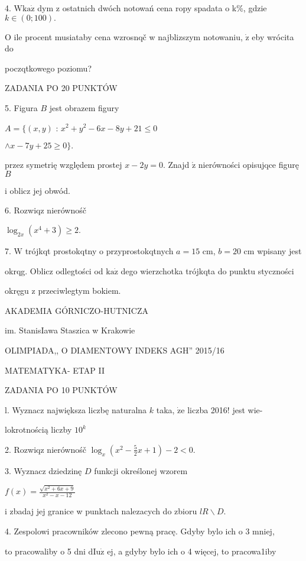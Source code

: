 \documentclass[a4paper,12pt]{article}
\begin{document}
4. $\mathrm{W}\mathrm{k}\mathrm{a}\dot{\mathrm{z}}$ dym z ostatnich dwóch notowań cena ropy spadata o k\%, gdzie $k\in(0;100).$

$\mathrm{O}$ ile procent musiataby cena wzrosnqč w najblizszym notowaniu, $\dot{\mathrm{z}}$ eby wrócita do

poczqtkowego poziomu?

ZADANIA PO 20 PUNKTÓW

5. Figura $B$ jest obrazem figury

$A=\{(x,y)$ : $x^{2}+y^{2}-6x-8y+21\leq 0$

$\wedge x-7y+25\geq 0\}.$

przez symetrię względem prostej $x-2y=0.$ Znajd $\acute{\mathrm{z}}$ nierówności opisujqce figurę $B$

i oblicz jej obwód.

6. Rozwiqz nierównośč

$\log_{2x}(x^{4}+3)\geq 2.$

7. $\mathrm{W}$ trójkqt prostokqtny o przyprostokqtnych $a = 15$ cm, $b = 20$ cm wpisany jest

okrqg. Oblicz odlegtości od $\mathrm{k}\mathrm{a}\dot{\mathrm{z}}$ dego wierzchotka trójkqta do punktu styczności

okręgu z przeciwlegtym bokiem.






AKADEMIA GÓRNICZO-HUTNICZA

im. StanisIawa Staszica w Krakowie

OLIMPIADA,, O DIAMENTOWY INDEKS AGH'' 2015/16

MATEMATYKA- ETAP II

ZADANIA PO 10 PUNKTÓW

l. Wyznacz największa liczbę naturalna $k$ taka, $\dot{\mathrm{z}}\mathrm{e}$ liczba 2016! jest wie-

lokrotnością liczby $10^{k}$

2. Rozwiqz nierównośč $\displaystyle \log_{x}(x^{2}-\frac{5}{2}x+1)-2<0.$

3. Wyznacz dziedzinę $D$ funkcji określonej wzorem

$f(x)=\displaystyle \frac{\sqrt{x^{2}+6x+9}}{x^{2}-x-12}$

i zbadaj jej granice w punktach nalezacych do zbioru $lR\backslash D.$

4. Zespolowi pracowników zlecono pewną pracę. Gdyby bylo ich o 3 mniej,

to pracowaliby o 5 dni $\mathrm{d}\mathrm{I}\mathrm{u}\dot{\mathrm{z}}$ ej, a gdyby bylo ich o 4 więcej, to pracowa1iby
\end{document}
